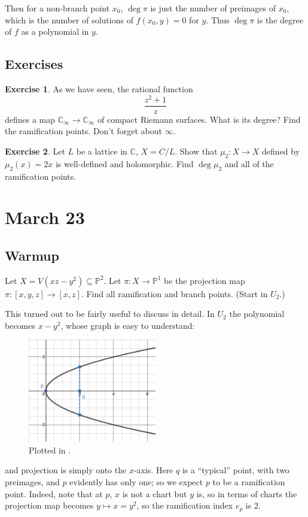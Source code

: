 \documentclass[12pt]{article}
\newcommand{\cx}{\mathbb{C}}
\newcommand{\p}{\mathbb{P}}
\theoremstyle{definition}
\newtheorem{exercise}{Exercise}
\theoremstyle{remark}
\begin{document}
Then for a non-branch point $x_0$, $\deg \pi$ is just the number of preimages of $x_0$, which is the number of solutions of $f(x_0,y) = 0$ for $y$. Thus $\deg \pi$ is the degree of $f$ as a polynomial in $y$.
\subsection{Exercises}
\begin{exercise}
    As we have seen, the rational function 
    \[
        \frac{z^2 + 1}{z}
    \]
    defines a map $\cx_{\infty} \to \cx_{\infty}$ of compact Riemann surfaces. What is its degree? Find the ramification points. Don't forget about $\infty$.
\end{exercise}
\begin{exercise}
    Let $L$ be a lattice in $\cx$, $X = C / L$. Show that $\mu_2 : X \to X$ defined by $\mu_2(x) = 2x$ is well-defined and holomorphic. Find $\deg \mu_2$ and all of the ramification points.
\end{exercise}
\section{March 23}
\subsection{Warmup}
Let $X = V(xz - y^2) \subseteq \p^2$. Let $\pi : X \to \p^1$ be the projection map $\pi : [x,y,z] \to [x,z]$. Find all ramification and branch points. (Start in $U_2$.)

This turned out to be fairly useful to discuss in detail. In $U_2$ the polynomial becomes $x - y^2$, whose graph is easy to understand: 
\begin{figure}[H]
    \centering
    \includegraphics[width = 0.5\textwidth]{14.png}
    \caption{Plotted in \cite{Desmos}.}
    \label{fig:Fig14}
\end{figure}
and projection is simply onto the $x$-axis. Here $q$ is a ``typical'' point, with two preimages, and $p$ evidently has only one; so we expect $p$ to be a ramification point. Indeed, note that at $p$, $x$ is not a chart but $y$ is, so in terms of charts the projection map becomes $y \mapsto x = y^2$, so the ramification index $e_p$ is 2.
\end{document}
